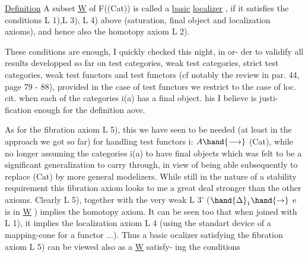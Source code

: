 
\uline{Definition}  A subset \underline{W} of F((Cat)) is called a \uline{basic} \uline{localizer} ,  if it
satisfies the conditions L 1),L 3), L 4) above (saturation, final object
and localization axioms),  and hence also the homotopy axiom L 2).

These conditions are enough,  I quickly checked this night,  in or-%
der to validify all results developped so far on test categories, weak
test categories,  strict test categories,  weak test functors and test
functors  (cf notably the review in par. 44, page 79 - 88),   provided
in the case of test functors we restrict to the case of loc. cit. when
each of the categories i(a) has a final object.  his I believe is justi-%
fication enough for the definition aove.

As for the fibration axiom\xout{\unsure{(}} L 5),  this we have seen to be needed
(at least in the approach we got so far) for handling test functors
i: $A \hand{\longrightarrow}$ (Cat),  while no longer assuming the categories i(a) to have final
objects\hand{,} \hand{(}which was felt to be a significant generalization to carry
through,  in view of being able subsequently to replace (Cat) by more
general modelizers\hand{)}. While still in the nature of a stability requirement\hand{,}
this fibration axiom looks to me a great deal stronger than the other
axioms.  Clearly L 5),  together with the very weak  L 3' ($\hand{\Delta}_1 \hand{\to}$ e is in
\hand{\unsure{$\vee$}}\underline{W} )  implies the homotopy axiom.  It can be seen too that when joined
with L 1),  it implies the localization axiom L 4 (using the standart
device of a mapping-cone for a functor ...)\hand{*}.  Thus a basic ocalizer
satisfying the fibration axiom L 5)  can be viewed also as a \underline{W}  satisfy-%
ing the conditions

